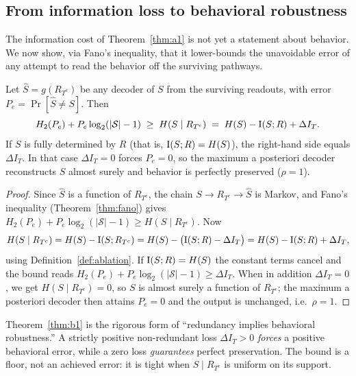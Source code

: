 \subsection{From information loss to behavioral robustness}
\label{subsec:behavior}

The information cost of Theorem~\ref{thm:a1} is not yet a statement about behavior. We
now show, via Fano's inequality, that it lower-bounds the unavoidable error of any
attempt to read the behavior off the surviving pathways.

\begin{theorem}
\label{thm:b1}
Let $\widehat{S}=g(R_{T^c})$ be any decoder of $S$ from the surviving readouts, with
error $P_e=\Pr[\widehat{S}\neq S]$. Then
\[
  H_2(P_e)+P_e\log_2(\lvert\mathcal{S}\rvert-1)
  \;\ge\; H(S\mid R_{T^c})
  \;=\; H(S)-\operatorname{I}(S;R)+\Delta I_T.
\]
If $S$ is fully determined by $R$ (that is, $\operatorname{I}(S;R)=H(S)$), the right-hand side
equals $\Delta I_T$. In that case $\Delta I_T=0$ forces $P_e=0$, so the maximum a
posteriori decoder reconstructs $S$ almost surely and behavior is perfectly preserved
($\rho=1$).
\end{theorem}

\begin{proof}
Since $\widehat{S}$ is a function of $R_{T^c}$, the chain $S\to R_{T^c}\to\widehat{S}$
is Markov, and Fano's inequality (Theorem~\ref{thm:fano}) gives
$H_2(P_e)+P_e\log_2(\lvert\mathcal{S}\rvert-1)\ge H(S\mid R_{T^c})$. Now
\[
  H(S\mid R_{T^c})=H(S)-\operatorname{I}(S;R_{T^c})=H(S)-\bigl(\operatorname{I}(S;R)-\Delta I_T\bigr)
  =H(S)-\operatorname{I}(S;R)+\Delta I_T,
\]
using Definition~\ref{def:ablation}. If $\operatorname{I}(S;R)=H(S)$ the constant terms cancel and
the bound reads $H_2(P_e)+P_e\log_2(\lvert\mathcal{S}\rvert-1)\ge\Delta I_T$. When in
addition $\Delta I_T=0$, we get $H(S\mid R_{T^c})=0$, so $S$ is almost surely a
function of $R_{T^c}$; the maximum a posteriori decoder then attains $P_e=0$ and the
output is unchanged, i.e.\ $\rho=1$.
\end{proof}

\begin{remark}
Theorem~\ref{thm:b1} is the rigorous form of ``redundancy implies behavioral
robustness.'' A strictly positive non-redundant loss $\Delta I_T>0$ \emph{forces} a
positive behavioral error, while a zero loss \emph{guarantees} perfect preservation.
The bound is a floor, not an achieved error: it is tight when $S\mid R_{T^c}$ is
uniform on its support.
\end{remark}

